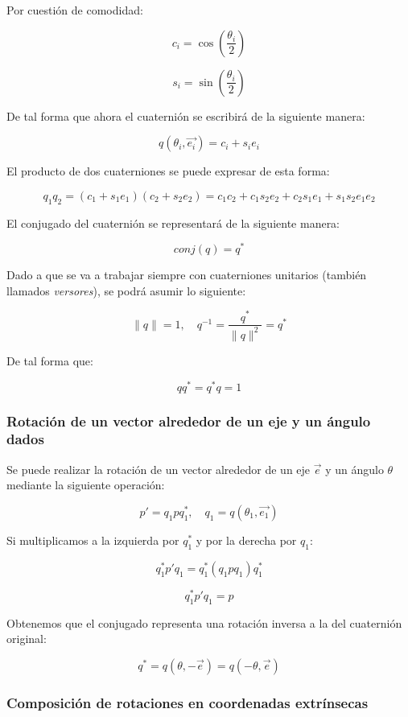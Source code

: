 \documentclass[10pt, a4paper]{report}
\begin{document}
Por cuestión de comodidad:

$$ c_i = \cos \left( \frac{\theta_i}{2} \right) $$

$$ s_i = \sin \left( \frac{\theta_i}{2} \right) $$

De tal forma que ahora el cuaternión se escribirá de la siguiente manera:

$$ q(\theta_i, \vec{e_i}) = c_i + s_i e_i $$

El producto de dos cuaterniones se puede expresar de esta forma:

$$ q_1 q_2 = \left( c_1 + s_1 e_1 \right) \left( c_2 + s_2 e_2 \right) = c_1 c_2 + c_1 s_2 e_2 + c_2 s_1 e_1 + s_1 s_2 e_1 e_2 $$

El conjugado del cuaternión se representará de la siguiente manera:

$$ conj(q) = q^* $$

Dado a que se va a trabajar siempre con cuaterniones unitarios (también llamados \textit{versores}), se podrá asumir lo siguiente:

$$ \|q\| = 1 , \quad q^{-1} = \frac{q^*}{\|q\|^2} = q^* $$

De tal forma que:

$$ qq^* = q^*q = 1 $$

\subsubsection{Rotación de un vector alrededor de un eje y un ángulo dados}

Se puede realizar la rotación de un vector alrededor de un eje $\vec{e}$ y un ángulo $\theta$ mediante la siguiente operación:

$$ p' = q_1pq_1^*, \quad q_1 = q(\theta_1, \vec{e_1})$$

Si multiplicamos a la izquierda por $q_1^*$ y por la derecha por $q_1$:

$$ q_1^*p'q_1 = q_1^*(q_1pq_1)q_1^* $$ 

$$ q_1^*p'q_1 = p $$

Obtenemos que el conjugado representa una rotación inversa a la del cuaternión original:

$$ q^* = q\left(\theta, -\vec{e} \right) = q\left(-\theta, \vec{e}\right)  $$

\subsubsection{Composición de rotaciones en coordenadas extrínsecas}
\end{document}
